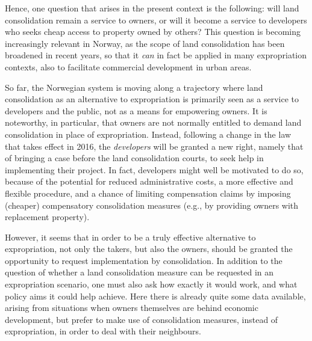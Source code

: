 Hence, one question that arises in the present context is the following: will land consolidation remain a service to owners, or will it become a service to developers who seeks cheap access to property owned by others? This question is becoming increasingly relevant in Norway, as the scope of land consolidation has been broadened in recent years, so that it {\it can} in fact be applied in many expropriation contexts, also to facilitate commercial development in urban areas.

So far, the Norwegian system is moving along a trajectory where land consolidation as an alternative to expropriation is primarily seen as a service to developers and the public, not as a means for empowering owners. It is noteworthy, in particular, that owners are not normally entitled to demand land consolidation in place of expropriation. Instead, following a change in the law that takes effect in 2016, the {\it developers} will be granted a new right, namely that of bringing a case before the land consolidation courts, to seek help in implementing their project. In fact, developers might well be motivated to do so, because of the potential for reduced administrative costs, a more effective and flexible procedure, and a chance of limiting compensation claims by imposing (cheaper) compensatory consolidation measures (e.g., by providing owners with replacement property).


However, it seems that in order to be a truly effective alternative to expropriation, not only the takers, but also the owners, should be granted the opportunity to request implementation by consolidation. In addition to the question of whether a land consolidation measure can be requested in an expropriation scenario, one must also ask how exactly it would work, and what policy aims it could help achieve. Here there is already quite some data available, arising from situations when owners themselves are behind economic development, but prefer to make use of consolidation measures, instead of expropriation, in order to deal with their neighbours.

